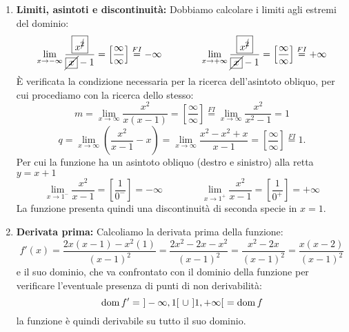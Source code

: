 \begin{ex}[Studiare la funzione $ y=\frac{x^2}{x-1}$.]
\begin{enumerate}
\begin{center}
\begin{tikzpicture}
                \end{tikzpicture}
            \end{center}
            \item \textbf{Limiti, asintoti e discontinuità:} Dobbiamo calcolare i limiti agli estremi del dominio:
            \[\lim_{x\to-\infty}\frac{\boxed{x^{\cancel{2}}}}{\cancel{\boxed{x}}-1}=\left[ \frac{\infty}{\infty} \right]\overset{FI}{=}-\infty \qquad \qquad \lim_{x\to+\infty}\frac{\boxed{x^{\cancel{2}}}}{\cancel{\boxed{x}}-1}=\left[ \frac{\infty}{\infty} \right]\overset{FI}{=}+\infty\]
            È verificata la condizione necessaria per la ricerca dell'asintoto obliquo, per cui procediamo con la ricerca dello stesso:
            \[m=\lim_{x\to\infty}\frac{{x^{{2}}}}{x({{x}}-1)}=\left[ \frac{\infty}{\infty} \right]\overset{FI}{=}\lim_{x\to\infty}\frac{x^2}{x^2-1}=1\]
            \[q=\lim_{x\to \infty}\left(\frac{x^2}{x-1}-x\right)=\lim_{x\to\infty}\frac{x^2-x^2+x}{x-1}=\left[ \frac{\infty}{\infty} \right]\overset{FI}{=}1.\]
            Per cui la funzione ha un asintoto obliquo (destro e sinistro) alla retta $y=x+1$
            \[\lim_{x\to1^-}\frac{x^2}{x-1}=\left[ \frac{1}{0^-} \right]=-\infty\qquad \qquad \lim_{x\to1^+}\frac{x^2}{x-1}=\left[ \frac{1}{0^+} \right]=+\infty\]
            La funzione presenta quindi una discontinuità di seconda specie in $x=1$.
            \item \textbf{Derivata prima:} Calcoliamo la derivata prima della funzione:
            \[f'(x) = \frac{2x(x-1)-x^2(1)}{(x-1)^2}=\frac{2x^2-2x-x^2}{(x-1)^2}=\frac{x^2-2x}{(x-1)^2}=\frac{x(x-2)}{(x-1)^2}\]
            e il suo dominio, che va confrontato con il dominio della funzione per verificare l'eventuale presenza di punti di non derivabilità:
            \[\dom f'= \ ]-\infty,1[\ \cup \ ]1,+\infty[\ = \dom f\]
            la funzione è quindi derivabile su tutto il suo dominio.


\end{enumerate}
\end{ex}
